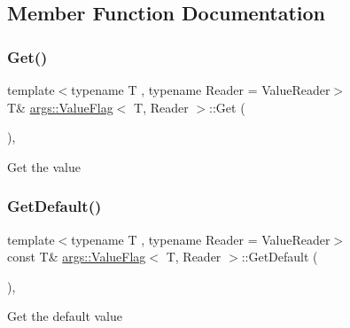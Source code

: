 \subsection{Member Function Documentation}
\mbox{\label{classargs_1_1_value_flag_a0a1d7aeb2db89af561f72f6839d152d4}} 
\subsubsection{\texorpdfstring{Get()}{Get()}}
{\footnotesize\ttfamily template$<$typename T , typename Reader  = Value\+Reader$>$ \\
T\& \hyperlink{classargs_1_1_value_flag}{args\+::\+Value\+Flag}$<$ T, Reader $>$\+::Get (\begin{DoxyParamCaption}{ }\end{DoxyParamCaption})\hspace{0.3cm}{\ttfamily [inline]}, {\ttfamily [noexcept]}}

Get the value \mbox{\label{classargs_1_1_value_flag_a80f91693dac484d0e89229bd2bf2ea5d}} 
\subsubsection{\texorpdfstring{Get\+Default()}{GetDefault()}}
{\footnotesize\ttfamily template$<$typename T , typename Reader  = Value\+Reader$>$ \\
const T\& \hyperlink{classargs_1_1_value_flag}{args\+::\+Value\+Flag}$<$ T, Reader $>$\+::Get\+Default (\begin{DoxyParamCaption}{ }\end{DoxyParamCaption})\hspace{0.3cm}{\ttfamily [inline]}, {\ttfamily [noexcept]}}

Get the default value \mbox{\label{classargs_1_1_value_flag_a47aa01f545a1781583c96af12c8e2062}} 
